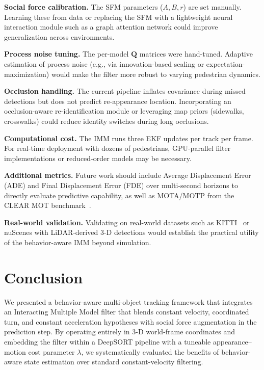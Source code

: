\documentclass[conference]{IEEEtran}
\begin{document}
\textbf{Social force calibration.} The SFM parameters ($A, B, r$) are set manually. Learning these from data or replacing the SFM with a lightweight neural interaction module such as a graph attention network could improve generalization across environments.

\textbf{Process noise tuning.} The per-model $\mathbf{Q}$ matrices were hand-tuned. Adaptive estimation of process noise (e.g., via innovation-based scaling or expectation-maximization) would make the filter more robust to varying pedestrian dynamics.

\textbf{Occlusion handling.} The current pipeline inflates covariance during missed detections but does not predict re-appearance location. Incorporating an occlusion-aware re-identification module or leveraging map priors (sidewalks, crosswalks) could reduce identity switches during long occlusions.

\textbf{Computational cost.} The IMM runs three EKF updates per track per frame. For real-time deployment with dozens of pedestrians, GPU-parallel filter implementations or reduced-order models may be necessary.

\textbf{Additional metrics.} Future work should include Average Displacement Error (ADE) and Final Displacement Error (FDE) over multi-second horizons to directly evaluate predictive capability, as well as MOTA/MOTP from the CLEAR MOT benchmark~\cite{bernardin2008evaluating}.

\textbf{Real-world validation.} Validating on real-world datasets such as KITTI~\cite{geiger2012we} or nuScenes with LiDAR-derived 3-D detections would establish the practical utility of the behavior-aware IMM beyond simulation.

\section{Conclusion}
\label{sec:conclusion}

We presented a behavior-aware multi-object tracking framework that integrates an Interacting Multiple Model filter that blends constant velocity, coordinated turn, and constant acceleration hypotheses with social force augmentation in the prediction step. By operating entirely in 3-D world-frame coordinates and embedding the filter within a DeepSORT pipeline with a tuneable appearance--motion cost parameter $\lambda$, we systematically evaluated the benefits of behavior-aware state estimation over standard constant-velocity filtering.
\end{document}
